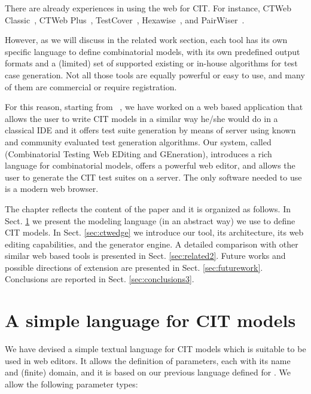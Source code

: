 \begin{tikzborder}{\cite{Gargantini16:validation}}
\begin{tikzborder}{\cite{gargantini_combinatorial_2017}}
\begin{tikzborder}{\cite{gargantini_combinatorial_2017}}
\begin{tikzborder}{\cite{garn2019}}
\begin{tikzborder}{\cite{arcaini2019achieving}}
There are already experiences in using the web for CIT. For instance, CTWeb Classic~\cite{usaolaframework}, CTWeb Plus~\cite{ctwebplus}, TestCover~\cite{testcover}, Hexawise~\cite{hexawise}, and PairWiser~\cite{pairwiser}. 

However, as we will discuss in the related work section, each tool has its own specific language to define combinatorial models, with its own predefined output formats and a (limited) set of supported existing or in-house algorithms for test case generation. Not all those tools are equally powerful or easy to use, and many of them are commercial or require registration.

For this reason, starting from \citlab~\cite{citlab12}, we have worked on a web based application that allows the user to write CIT models in a similar way he/she would do in a classical IDE and it offers test suite generation by means of   server using known and community evaluated test generation algorithms. 
Our system, called \ctwedge (Combinatorial Testing Web EDiting and GEneration), introduces a rich language for combinatorial models, offers a powerful web editor, and allows the user to generate the CIT test suites on a server. The only software needed to use \ctwedge is a modern web browser.

The chapter reflects the content of the paper \cite{IWCTGargantini2018} and it is organized as follows. In Sect. \ref{sec:language} we present the modeling language (in an abstract way) we use to define CIT models. In Sect. \ref{sec:ctwedge} we introduce our tool, its architecture, its web editing capabilities, and the generator engine. A detailed comparison with other similar web based tools is presented in  Sect. \ref{sec:related2}. Future works and possible directions of extension are presented in Sect. \ref{sec:futurework}. Conclusions are reported in Sect. \ref{sec:conclusions3}.

\section{A simple language for CIT models}\label{sec:language}

\begin{tikzborder}{\cite{IWCTGargantini2018}}
We have devised a simple textual language for CIT models which is suitable to be used in web editors. It allows the definition of parameters, each with its name and (finite) domain, and it is based on our previous language defined for \citlab \cite{citlab12}. We allow the following parameter types: 


\end{tikzborder}
\end{tikzborder}
\end{tikzborder}
\end{tikzborder}
\end{tikzborder}
\end{tikzborder}

